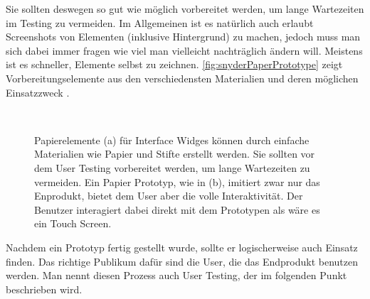 \medskip Sie sollten deswegen so gut wie möglich vorbereitet werden, um lange Wartezeiten im Testing zu vermeiden. Im Allgemeinen ist es natürlich auch erlaubt Screenshots von Elementen (inklusive Hintergrund) zu machen, jedoch muss man sich dabei immer fragen wie viel man vielleicht nachträglich ändern will. Meistens ist es schneller, Elemente selbst zu zeichnen. \autoref{fig:snyderPaperPrototype} zeigt Vorbereitungselemente aus den verschiedensten Materialien und deren möglichen Einsatzzweck \citep{Snyder:2003}.

\begin{figure}
	\myfloatalign
	 \quad
	 \\
	\caption[Paper Prototyping \newline \citep{Sagmeister:2008}]{Papierelemente (a) für Interface Widges können durch einfache Materialien wie Papier und Stifte erstellt werden. Sie sollten vor dem User Testing vorbereitet werden, um lange Wartezeiten zu vermeiden. Ein Papier Prototyp, wie in (b), imitiert zwar nur das Enprodukt, bietet dem User aber die volle Interaktivität. Der Benutzer interagiert dabei direkt mit dem Prototypen als wäre es ein Touch Screen.}\label{fig:snyderPaperPrototype}
\end{figure}

\medskip Nachdem ein Prototyp fertig gestellt wurde, sollte er logischerweise auch Einsatz finden. Das richtige Publikum dafür sind die User, die das Endprodukt benutzen werden. Man nennt diesen Prozess auch User Testing, der im folgenden Punkt beschrieben wird.

